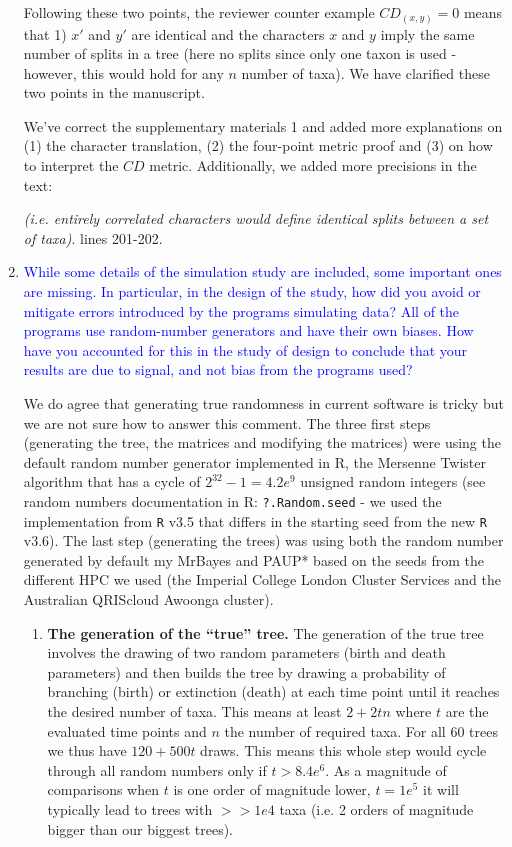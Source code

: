 \documentclass[12pt,letterpaper]{article}
\begin{document}
\begin{enumerate}
Following these two points, the reviewer counter example $CD_{(x,y)} = 0$ means that 1) $x'$ and $y'$ are identical and the characters $x$ and $y$ imply the same number of splits in a tree (here no splits since only one taxon is used - however, this would hold for any $n$ number of taxa).
We have clarified these two points in the manuscript.

We've correct the supplementary materials 1 and added more explanations on (1) the character translation, (2) the four-point metric proof and (3) on how to interpret the $CD$ metric.
Additionally, we added more precisions in the text:

\textit{(i.e. entirely correlated characters would define identical splits between a set of taxa)}. lines 201-202.

\item{\textcolor{blue}{While some details of the simulation study are included, some important ones are missing. In particular, in the design of the study, how did you avoid or mitigate errors introduced by the programs simulating data? All of the programs use random-number generators and have their own biases. How have you accounted for this in the study of design to conclude that your results are due to signal, and not bias from the programs used?}}

We do agree that generating true randomness in current software is tricky but we are not sure how to answer this comment.
The three first steps (generating the tree, the matrices and modifying the matrices) were using the default random number generator implemented in R, the Mersenne Twister algorithm that has a cycle of $2^{32}-1 = 4.2e^{9}$ unsigned random integers (see random numbers documentation in R: \texttt{?.Random.seed} - we used the implementation from \texttt{R} v3.5 that differs in the starting seed from the new \texttt{R} v3.6).
The last step (generating the trees) was using both the random number generated by default my MrBayes and PAUP* based on the seeds from the different HPC we used (the Imperial College London Cluster Services and the Australian QRIScloud Awoonga cluster).

\begin{enumerate}
    \item \textbf{The generation of the ``true'' tree.}
    The generation of the true tree involves the drawing of two random parameters (birth and death parameters) and then builds the tree by drawing a probability of branching (birth) or extinction (death) at each time point until it reaches the desired number of taxa.
    This means at least $2 + 2tn$ where $t$ are the evaluated time points and $n$ the number of required taxa.
    For all 60 trees we thus have $120 + 500t$ draws. This means this whole step would cycle through all random numbers only if $t > 8.4e^{6}$. As a magnitude of comparisons when $t$ is one order of magnitude lower, $t = 1e^{5}$ it will typically lead to trees with $>> 1e{4}$ taxa (i.e. 2 orders of magnitude bigger than our biggest trees).
    

\end{enumerate}
\end{enumerate}
\end{document}
